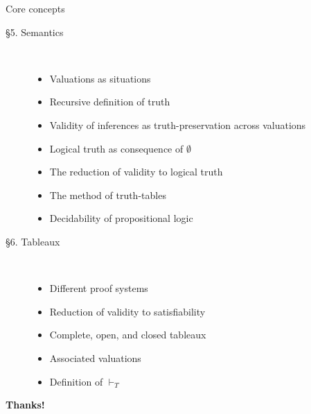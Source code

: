 \documentclass[../slides.tex]{subfiles}
\begin{document}
\begin{frame}{Core concepts}

	\begin{description}
	
		\item[\S5. Semantics] \
		
			\begin{itemize}
			
				\item Valuations as situations
				
				\item Recursive definition of truth
				
				\item Validity of inferences as truth-preservation across valuations
				
				\item Logical truth as consequence of $\emptyset$
				
				\item The reduction of validity to logical truth
				
				\item The method of truth-tables
			
				\item Decidability of propositional logic
			
			\end{itemize}
	
		\item[\S6. Tableaux] \
		
			\begin{itemize}
									
				\item Different proof systems
				
				\item Reduction of validity to satisfiability
				
				\item Complete, open, and closed tableaux
				
				\item Associated valuations
				
				\item Definition of $\vdash_T$
			
			\end{itemize}
	
	\end{description}

\end{frame}

\begin{frame}

	\begin{center}
	{\huge\bf Thanks!}
	\end{center}

\end{frame}
\end{document}
